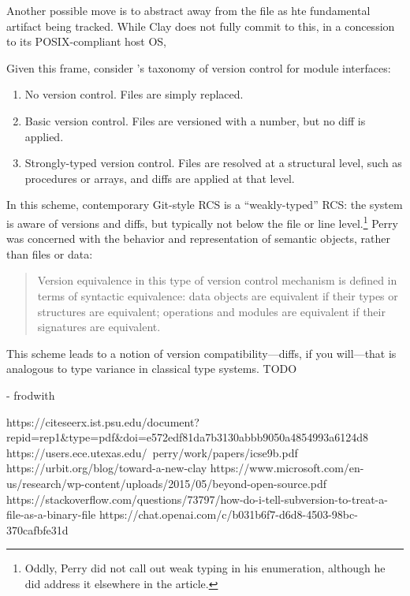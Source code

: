 \documentclass[twoside]{article}
\begin{document}
Another possible move is to abstract away from the file as hte fundamental artifact being tracked.  While Clay does not fully commit to this, in a concession to its POSIX-compliant host OS,


Given this frame, consider \citeauthor{Perry1987}'s taxonomy of version control for module interfaces:

\begin{enumerate}
  \item  No version control.  Files are simply replaced.
  \item  Basic version control.  Files are versioned with a number, but no diff is applied.
  \item  Strongly-typed version control.  Files are resolved at a structural level, such as procedures or arrays, and diffs are applied at that level.
\end{enumerate}

\noindent
In this scheme, contemporary Git-style RCS is a ``weakly-typed'' RCS:  the system is aware of versions and diffs, but typically not below the file or line level.\footnote{Oddly, Perry did not call out weak typing in his enumeration, although he did address it elsewhere in the article.}  Perry was concerned with the behavior and representation of semantic objects, rather than files or data:

\begin{quote}
  Version equivalence in this type of version control mechanism is defined in terms of syntactic equivalence:  data objects are equivalent if their types or structures are equivalent; operations and modules are equivalent if their signatures are equivalent.
\end{quote}

\noindent
This scheme leads to a notion of version compatibility—diffs, if you will—that is analogous to type variance in classical type systems. TODO


- frodwith

https://citeseerx.ist.psu.edu/document?repid=rep1&type=pdf&doi=e572edf81da7b3130abbb9050a4854993a6124d8
https://users.ece.utexas.edu/~perry/work/papers/icse9b.pdf
https://urbit.org/blog/toward-a-new-clay
https://www.microsoft.com/en-us/research/wp-content/uploads/2015/05/beyond-open-source.pdf
https://stackoverflow.com/questions/73797/how-do-i-tell-subversion-to-treat-a-file-as-a-binary-file
https://chat.openai.com/c/b031b6f7-d6d8-4503-98bc-370cafbfe31d
\end{document}
